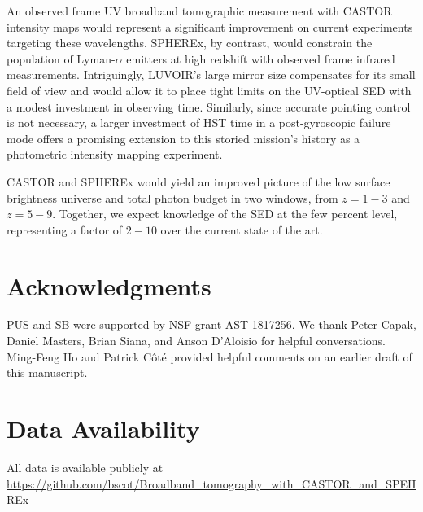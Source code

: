 \documentclass[fleqn,usenatbib]{mnras}
\begin{document}
An observed frame UV broadband tomographic measurement with {\small CASTOR} intensity maps would represent a significant improvement on current experiments targeting these wavelengths. {\small SPHEREx}, by contrast, would constrain the population of Lyman-$\alpha$ emitters at high redshift with observed frame infrared measurements. 
Intriguingly, {\small LUVOIR}'s large mirror size compensates for its small field of view and would allow it to place tight limits on the UV-optical SED with a modest investment in observing time. Similarly, since accurate pointing control is not necessary, a larger investment of HST time in a post-gyroscopic failure mode offers a promising extension to this storied mission's history as a photometric intensity mapping experiment.

{\small CASTOR} and {\small SPHEREx} would yield an improved picture of the low surface brightness universe and total photon budget in two windows, from $z=1-3$ and $z=5-9$. Together, we expect knowledge of the SED at the few percent level, representing a factor of $2-10$ over the current state of the art.


\section*{Acknowledgments}

PUS and SB were supported by NSF grant AST-1817256. We thank Peter Capak, Daniel Masters, Brian Siana, and Anson D'Aloisio for helpful conversations. Ming-Feng Ho and Patrick C\^ot\'e provided helpful comments on an earlier draft of this manuscript.

\section*{Data Availability}

All data is available publicly at \url{https://github.com/bscot/Broadband_tomography_with_CASTOR_and_SPEHREx}


{}



\bsp	%
\label{lastpage}
\end{document}
